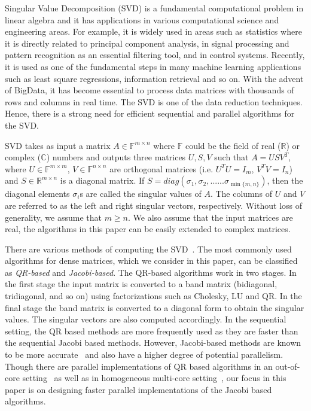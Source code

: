 \documentclass[10pt, conference, compsocconf]{IEEEtran}
\begin{document}
Singular Value Decomposition (SVD) is a fundamental computational problem in linear algebra and it has applications in various computational science and engineering areas. For example, it is widely used in areas such as statistics where it is directly related to principal component analysis, in signal processing and pattern recognition as an essential filtering tool, and in control systems. Recently, it is used as one of the fundamental steps in many machine learning applications such as least square regressions, information retrieval and so on. With the advent of BigData, it has become essential to process data matrices with thousands of rows and columns in real time. The SVD is one of the data reduction techniques. Hence, there is a strong need for efficient sequential and parallel algorithms for the SVD.

SVD takes as input a matrix $A \in \mathbb{F}^{m \times n}$ where $\mathbb{F}$ could be the field of real ($\mathbb{R}$) or complex ($\mathbb{C}$) numbers and outputs three matrices $U, S, V$ such that $A = USV^T$, where $U \in \mathbb{F}^{m \times m}$, $V \in \mathbb{F}^{n \times n}$ are orthogonal matrices (i.e. $U^TU = I_m$, $V^TV = I_n$) and $S \in \mathbb{R}^{m \times n}$ is a diagonal matrix. If $S = diag(\sigma_1, \sigma_2,......\sigma_{\min\{m,n\}})$, then the diagonal elements $\sigma_i$s are called the singular values of $A$. The columns of $U$ and $V$ are referred to as the left and right singular vectors, respectively. Without loss of generality, we assume that $m \ge n$. We also assume that the input matrices are real, the algorithms in this paper can be easily extended to complex matrices. 

There are various methods of computing the SVD~\cite{golub2012matrix}. The most commonly used algorithms for dense matrices, which we consider in this paper, can be classified as \emph{QR-based} and \emph{Jacobi-based}. The QR-based algorithms work in two stages. In the first stage the input matrix is converted to a band matrix (bidiagonal, tridiagonal, and so on) using factorizations such as Cholesky, LU and QR. In the final stage the band matrix is converted to a diagonal form to obtain the singular values. The singular vectors are also computed accordingly. In the sequential setting, the QR based methods are more frequently used as they are faster than the sequential Jacobi based methods. However, Jacobi-based methods are known to be more accurate~\cite{demmel1992jacobi} and also have a higher degree of potential parallelism. Though there are parallel implementations of QR based algorithms in an out-of-core setting~\cite{grimes1987solution, grimes1988solution} as well as in homogeneous multi-core setting~\cite{haidar2013improved}, our focus in this paper  is on designing faster parallel implementations of the Jacobi based algorithms.
\end{document}

